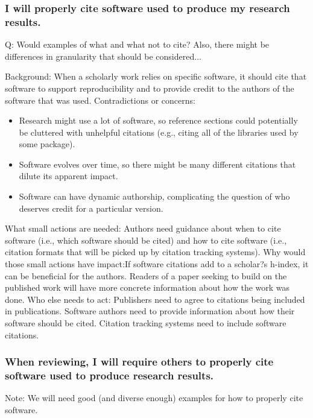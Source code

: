\documentclass[a4paper,UKenglish]{dagman}
\renewcommand{\paragraph}[1]{\subsubsection*{#1}\xspace}
\begin{document}
\paragraph{I will properly cite software used to produce my research results.}

Q: Would examples of what and what not to cite? Also, there might be differences in granularity that should be considered...


Background: When a scholarly work relies on specific software, it should cite that software to support reproducibility and to provide credit to the authors of the software that was used.
Contradictions or concerns: 
\begin{itemize}
\item Research might use a lot of software, so reference sections could potentially be cluttered with unhelpful citations (e.g., citing all of the libraries used by some package). 
\item Software evolves over time, so there might be many different citations that dilute its apparent impact. 
\item Software can have dynamic authorship, complicating the question of who deserves credit for a particular version. 
\end{itemize}

What small actions are needed: Authors need guidance about when to cite software (i.e., which software should be cited) and how to cite software (i.e., citation formats that will be picked up by citation tracking systems). 
Why would those small actions have impact:If software citations add to a scholar?s h-index, it can be beneficial for the authors. Readers of a paper seeking to build on the published work will have more concrete information about how the work was done. 
Who else needs to act: Publishers need to agree to citations being included in publications. Software authors need to provide information about how their software should be cited. Citation tracking systems need to include software citations. 


\paragraph{When reviewing, I will require others to properly cite software used to produce research results.}

Note: We will need good (and diverse enough) examples for how to properly cite software.

\end{document}
